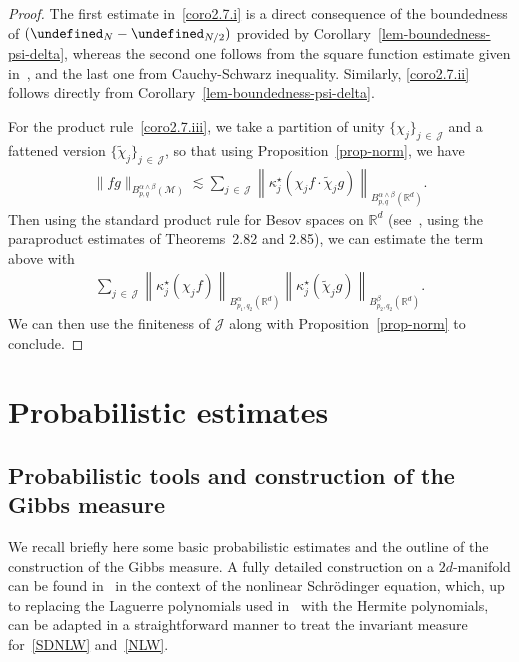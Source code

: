 \documentclass[AHL,Unicode,longabstracts,published]{cedram}
\newcommand{\R}{\mathbb{R}}
\let\P= \undefined
\newcommand{\P}{\mathbf{P}}
\newcommand{\J}{\mathcal{J}}
\newcommand{\M}{\mathcal{M}}
\newcommand{\kk}{\kappa}
\newcommand{\les}{\lesssim}
\begin{document}
\begin{proof}
The first estimate in~\eqref{coro2.7.i} is a direct consequence of the boundedness of $(\P_N-\P_{N/2})$ provided by Corollary~\ref{lem-boundedness-psi-delta}, whereas the second one follows from the square function estimate given in~\cite[Corollary~2.3]{BGT}, and the last one from Cauchy-Schwarz inequality. Similarly, \eqref{coro2.7.ii} follows directly from Corollary~\ref{lem-boundedness-psi-delta}.

For the product rule~\eqref{coro2.7.iii}, we take a partition of unity $\{\chi_j\}_{j\,\in\,\J}$ and a fattened version $\{\widetilde{\chi}_j\}_{j\,\in\,\J}$, so that using Proposition~\ref{prop-norm}, we have
\begin{align*}
\|fg\|_{B^{\alpha\wedge\beta}_{p,q}(\M)}\les \sum_{j\,\in\,\J}\left\|\kk_j^{\star}\left(\chi_jf\cdot\widetilde{\chi}_jg\right)\right\|_{B^{\alpha\wedge\beta}_{p,q}(\R^d)}.
\end{align*}
Then using the standard product rule for Besov spaces on $\R^d$ (see~\cite{BCD}, using the paraproduct estimates of Theorems~2.82 and 2.85), we can estimate the term above with
\begin{align*}
\sum_{j\,\in\,\J}\left\|\kk_j^{\star}(\chi_jf)\right\|_{B_{p_1,q_2}^{\alpha}(\R^d)}\left\|\kk_j^{\star}(\widetilde{\chi}_jg)\right\|_{B^{\beta}_{p_2,q_2}(\R^d)}.
\end{align*}
We can then use the finiteness of $\J$ along with Proposition~\ref{prop-norm} to conclude.
\end{proof}


\section{Probabilistic estimates}\label{sec-proba}
\subsection{Probabilistic tools and construction of the Gibbs measure}
We recall briefly here some basic probabilistic estimates and the outline of the construction of the Gibbs measure. A fully detailed construction on a $2d$-manifold can be found in~\cite{OT1} in the context of the nonlinear Schr\"odinger equation, which, up to replacing the Laguerre polynomials used in~\cite{OT1} with the Hermite polynomials, can be adapted in a straightforward manner to treat the invariant measure for~\eqref{SDNLW} and~\eqref{NLW}.
\end{document}
